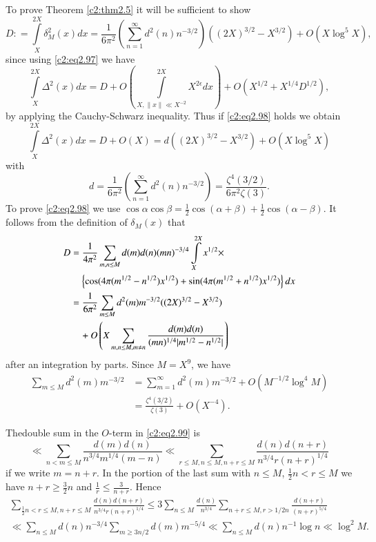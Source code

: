 To prove Theorem \ref{c2:thm2.5} it will be sufficient to show
\begin{equation}
  D: = \int\limits_X^{2X} \delta_M^2 (x) dx = \frac{1}{6 \pi^2}
  \left(\sum_{n=1}^\infty d^2 (n) n^{-3/2} \right) ((2X)^{3/2} -
  X^{3/2}) + O (X \log^5 X),\label{c2:eq2.98}
\end{equation}
since using \eqref{c2:eq2.97} we have
$$
\int\limits_{X}^{2X} \Delta ^2 (x) dx = D+ O\left(\int\limits_{X,
  \parallel x\parallel \ll X^{-2}}^{2X} X^{2 \epsilon} dx \right) +
O(X^{1/2} + X^{1/4} D^{1/2}),
$$
by applying the Cauchy-Schwarz inequality. Thus if \eqref{c2:eq2.98}
holds we obtain
$$
\int\limits_X^{2X} \Delta ^2 (x) dx = D + O(X)= d((2X)^{3/2}-
X^{3/2}) + O (X \log^5 X)
$$ 
with
$$
d= \frac{1}{6\pi^2} \left(\sum_{n=1}^\infty  d^2 (n) n^{-3/2}\right)=
\frac{\zeta^4 (3/2)}{6\pi^2 \zeta(3)}.
$$
To prove \eqref{c2:eq2.98} we use $\cos \alpha \cos \beta = \frac{1}{2} \cos
(\alpha + \beta)+ \frac{1}{2} \cos (\alpha- \beta)$. It follows from the
definition of $\delta_M(x)$ that
\begin{align}
  D & = \frac{1}{4 \pi^2} \sum_{m, n \leq M} d(m) d(n) (mn)^{-3/4}
  \int\limits_X^{2X} x^{1/2}\times\notag\\
  &\quad\left\{\cos (4 \pi (m^{1/2}- n^{1/2})x^{1/2}) + \sin (4 \pi
  (m^{1/2}+ n^{1/2})x^{1/2}) \right\}dx\notag\\
  & = \frac{1}{6 \pi^2} \sum_{m \leq M} d^2 (m) m^{-3/2} ((2X)^{3/2}-
  X^{3/2})\notag\\ 
  &\quad + O \left(X \sum_{m, n\leq M, m \neq n}
  \frac{d(m)d(n)}{(mn)^{1/4}|m^{1/2} - n^{1/2}|} \right)\label{c2:eq2.99}
\end{align}
after an integration by parts. Since $M = X^9$, we have
\begin{align*}
  \sum_{m \leq M} d^2 (m) m^{-3/2} & = \sum_{m=1}^\infty d^2 (m) m^{-3/2}
  + O(M^{-1/2} \log^4 M)\\ 
  &= \frac{\zeta^4 (3/2)}{\zeta(3)} + O (X^{-4}). 
\end{align*}

The\pageoriginale double sum in the $O$-term in \eqref{c2:eq2.99} is 
$$
\ll \sum_{n < m \leq M} \frac{d(m) d(n)}{n^{3/4} m^{1/4} (m-n)} \ll
\sum_{r \leq M, n\leq M, n+ r\leq M}\frac{d(n)
  d(n+r)}{n^{3/4}r(n+r)^{1/4}} 
$$
if we write $m=n+r$. In the portion of the last sum with $n \leq M$,
$\frac{1}{2} n< r \leq M$ we have $n+r \geq \frac{3}{2} n$ and $\frac{1}{r}
\leq \frac{3}{n+r}$. Hence
\begin{multline*}
  \sum_{\frac{1}{2} n < r \leq M, n+ r \leq M} \frac{d(n) d(n+r)}{n^{3/4}
    r(n+r)^{1/4}} \leq 3 \sum_{n \leq M} \frac{d(n)}{n^{3/4}} \sum_{n
    +r \leq M, r> 1/2 n} \frac{d (n+r)}{(n+r)^{5/4}}\\
  \ll \sum_{n \leq M} d(n) n^{- 3/4} \sum_{m \geq 3n/2} d(m) m^{-5/4}
  \ll \sum_{n \leq M} d(n) n^{-1} \log n \ll \log^2 M.
\end{multline*}

